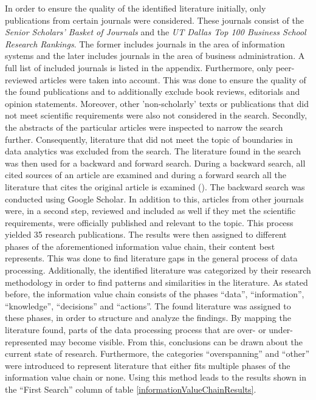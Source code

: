 In order to ensure the quality of the identified literature initially, only publications from certain journals were considered. These journals consist of the \textit{Senior Scholars' Basket of Journals} and the \textit{UT Dallas Top 100 Business School Research Rankings}. The former includes journals in the area of information systems and the later includes journals in the area of business administration. A full list of included journals is listed in the appendix. Furthermore, only peer-reviewed articles were taken into account. This was done to ensure the quality of the found publications and to additionally exclude book reviews, editorials and opinion statements. Moreover, other 'non-scholarly' texts or publications that did not meet scientific requirements were also not considered in the search. Secondly, the abstracts of the particular articles were inspected to narrow the search further. Consequently, literature that did not meet the topic of boundaries in data analytics was excluded from the search. %
The literature found in the search was then used for a backward and forward search. During a backward search, all cited sources of an article are examined and during a forward search all the literature that cites the original article is examined (\cite{Webster.2002}). The backward search was conducted using Google Scholar. In addition to this, articles from other journals were, in a second step, reviewed and included as well if they met the scientific requirements, were officially published and relevant to the topic. This process yielded 35 research publications. The results were then assigned to different phases of the aforementioned information value chain, their content best represents. This was done to find literature gaps in the general process of data processing. Additionally, the identified literature was categorized by their research methodology in order to find patterns and similarities in the literature. 
As stated before, the information value chain consists of the phases \enquote{data}, \enquote{information}, \enquote{knowledge}, \enquote{decisions} and \enquote{actions}. The found literature was assigned to these phases, in order to structure and analyze the findings. %
By mapping the literature found, parts of the data processing process that are over- or under-represented may become visible. From this, conclusions can be drawn about the current state of research. Furthermore, the categories \enquote{overspanning} and \enquote{other} were introduced to represent literature that either fits multiple phases of the information value chain or none. Using this method leads to the results shown in the \enquote{First Search} column of table \ref{informationValueChainResults}.

